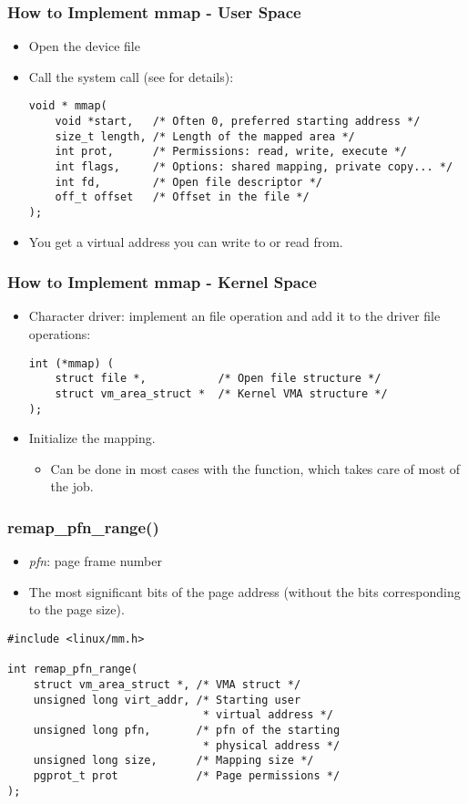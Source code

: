 \begin{frame}[fragile]
  \frametitle{How to Implement mmap - User Space}
  \begin{itemize}
  \item Open the device file
  \item Call the  system call (see  for
    details):
    \begin{verbatim}
void * mmap(
    void *start,   /* Often 0, preferred starting address */
    size_t length, /* Length of the mapped area */
    int prot,      /* Permissions: read, write, execute */
    int flags,     /* Options: shared mapping, private copy... */
    int fd,        /* Open file descriptor */
    off_t offset   /* Offset in the file */
);
    \end{verbatim}
  \item You get a virtual address you can write to or read from.
  \end{itemize}
\end{frame}

\begin{frame}[fragile]
  \frametitle{How to Implement mmap - Kernel Space}
  \begin{itemize}
  \item Character driver: implement an  file operation and add it
    to the driver file operations:
    \begin{verbatim}
int (*mmap) (
    struct file *,           /* Open file structure */
    struct vm_area_struct *  /* Kernel VMA structure */
);
    \end{verbatim}
  \item Initialize the mapping.
    \begin{itemize}
    \item Can be done in most cases with the 
      function, which takes care of most of the job.
    \end{itemize}
  \end{itemize}
\end{frame}

\begin{frame}[fragile]
  \frametitle{remap\_pfn\_range()}
  \begin{itemize}
  \item \emph{pfn}: page frame number
  \item The most significant bits of the page address (without the
    bits corresponding to the page size).
  \end{itemize}
  \begin{verbatim}
#include <linux/mm.h>

int remap_pfn_range(
    struct vm_area_struct *, /* VMA struct */
    unsigned long virt_addr, /* Starting user
                              * virtual address */
    unsigned long pfn,       /* pfn of the starting
                              * physical address */
    unsigned long size,      /* Mapping size */
    pgprot_t prot            /* Page permissions */
);
  \end{verbatim}
\end{frame}

